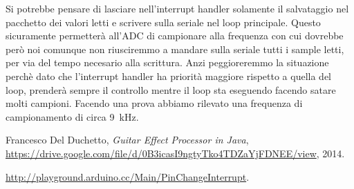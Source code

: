 \documentclass[a4paper,11pt]{article}
\begin{document}
\vspace{0.2in}
Si potrebbe pensare di lasciare nell'interrupt handler solamente il salvataggio nel pacchetto dei valori letti e scrivere sulla seriale nel loop principale. Questo sicuramente permetterà all'ADC di campionare alla frequenza con cui dovrebbe però noi comunque non riusciremmo a mandare sulla seriale tutti i sample letti, per via del tempo necesario alla scrittura. Anzi peggioreremmo la situazione perchè dato che l'interrupt handler ha priorità maggiore rispetto a quella del loop, prenderà sempre il controllo mentre il loop sta eseguendo facendo satare molti campioni. Facendo una prova abbiamo rilevato una frequenza di campionamento di circa \SI{9}{\kilo\hertz}.

\begin{thebibliography}{9}

  Francesco Del Duchetto,
  \emph{Guitar Effect Processor in Java},
  \url{https://drive.google.com/file/d/0B3icasI9ngtyTko4TDZaYjFDNEE/view},
  2014.

	\url{http://playground.arduino.cc/Main/PinChangeInterrupt}.

\end{thebibliography}
\end{document}
